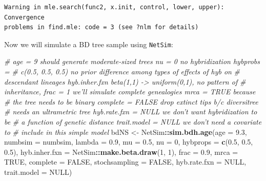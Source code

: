 \documentclass[]{article}
\newenvironment{Shaded}{\begin{snugshade}}{\end{snugshade}}
\newcommand{\KeywordTok}[1]{\textcolor[rgb]{0.13,0.29,0.53}{\textbf{#1}}}
\newcommand{\DataTypeTok}[1]{\textcolor[rgb]{0.13,0.29,0.53}{#1}}
\newcommand{\DecValTok}[1]{\textcolor[rgb]{0.00,0.00,0.81}{#1}}
\newcommand{\FloatTok}[1]{\textcolor[rgb]{0.00,0.00,0.81}{#1}}
\newcommand{\StringTok}[1]{\textcolor[rgb]{0.31,0.60,0.02}{#1}}
\newcommand{\CommentTok}[1]{\textcolor[rgb]{0.56,0.35,0.01}{\textit{#1}}}
\newcommand{\OtherTok}[1]{\textcolor[rgb]{0.56,0.35,0.01}{#1}}
\newcommand{\OperatorTok}[1]{\textcolor[rgb]{0.81,0.36,0.00}{\textbf{#1}}}
\newcommand{\NormalTok}[1]{#1}
\begin{document}
\begin{verbatim}
Warning in mle.search(func2, x.init, control, lower, upper): Convergence
problems in find.mle: code = 3 (see ?nlm for details)
\end{verbatim}

Now we will simulate a BD tree sample using \texttt{NetSim}:

\begin{Shaded}
\begin{Highlighting}[]
\CommentTok{# age = 9 should generate moderate-sized trees nu = 0 no hybridization hybprobs =}
\CommentTok{# c(0.5, 0.5, 0.5) no prior difference among types of effects of hyb on}
\CommentTok{# descendant lineages hyb.inher.fxn beta(1,1) -> uniform(0,1), no pattern of}
\CommentTok{# inheritance, frac = 1 we'll simulate complete genealogies mrca = TRUE because}
\CommentTok{# the tree needs to be binary complete = FALSE drop extinct tips b/c diversitree}
\CommentTok{# needs an ultrametric tree hyb.rate.fxn = NULL we don't want hybridization to be}
\CommentTok{# a function of genetic distance trait.model = NULL we don't need a covariate to}
\CommentTok{# include in this simple model}
\NormalTok{bdNS <-}\StringTok{ }\NormalTok{NetSim}\OperatorTok{::}\KeywordTok{sim.bdh.age}\NormalTok{(}\DataTypeTok{age =} \FloatTok{9.3}\NormalTok{, }\DataTypeTok{numbsim =}\NormalTok{ numbsim, }\DataTypeTok{lambda =} \FloatTok{0.9}\NormalTok{, }\DataTypeTok{mu =} \FloatTok{0.5}\NormalTok{, }
    \DataTypeTok{nu =} \DecValTok{0}\NormalTok{, }\DataTypeTok{hybprops =} \KeywordTok{c}\NormalTok{(}\FloatTok{0.5}\NormalTok{, }\FloatTok{0.5}\NormalTok{, }\FloatTok{0.5}\NormalTok{), }\DataTypeTok{hyb.inher.fxn =}\NormalTok{ NetSim}\OperatorTok{::}\KeywordTok{make.beta.draw}\NormalTok{(}\DecValTok{1}\NormalTok{, }
        \DecValTok{1}\NormalTok{), }\DataTypeTok{frac =} \FloatTok{0.9}\NormalTok{, }\DataTypeTok{mrca =} \OtherTok{TRUE}\NormalTok{, }\DataTypeTok{complete =} \OtherTok{FALSE}\NormalTok{, }\DataTypeTok{stochsampling =} \OtherTok{FALSE}\NormalTok{, }\DataTypeTok{hyb.rate.fxn =} \OtherTok{NULL}\NormalTok{, }
    \DataTypeTok{trait.model =} \OtherTok{NULL}\NormalTok{)}


\end{Highlighting}
\end{Shaded}
\end{document}

